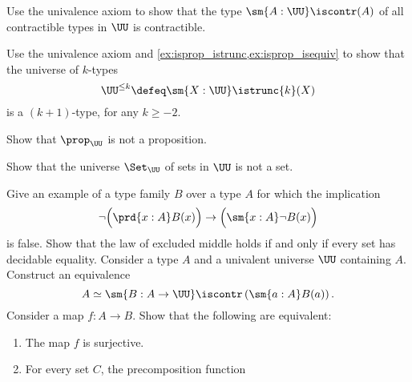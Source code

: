\begin{exercises}
  \exitem \label{ex:istrunc_UUtrunc}
  \begin{subexenum}
  \item Use the univalence axiom to show that the type $\sm{A:\UU}\iscontr(A)$ of all contractible types in $\UU$ is contractible.
  \item Use the univalence axiom and \cref{ex:isprop_istrunc,ex:isprop_isequiv} to show that the universe of $k$-types
    \begin{equation*}
      \UU^{\leq k}\defeq \sm{X:\UU}\istrunc{k}(X)
    \end{equation*}
    is a $(k+1)$-type, for any $k\geq -2$.
  \item Show that $\prop_\UU$ is not a proposition.
  \item Show that the universe $\Set_\UU$ of sets in $\UU$ is not a set. 
  \end{subexenum}
  \exitem Give an example of a type family $B$ over a type $A$ for which the implication
  \begin{equation*}
    \neg\Big(\prd{x:A}B(x)\Big) \to \Big(\sm{x:A}\neg B(x)\Big)
  \end{equation*}
  is false.
  \exitem Show that the law of excluded middle holds if and only if every set has decidable equality.
  \exitem Consider a type $A$ and a univalent universe $\UU$ containing $A$. Construct an equivalence
  \begin{equation*}
    A\simeq\sm{B:A\to\UU}\iscontr\left(\sm{a:A}B(a)\right).
  \end{equation*}
  \exitem \label{ex:surjective-precomp}Consider a map $f:A\to B$. Show that the following are equivalent:
  \begin{enumerate}
  \item The map $f$ is surjective.
  \item For every set $C$, the precomposition function
    \begin{equation*}

\end{equation*}
\end{enumerate}
\end{exercises}
